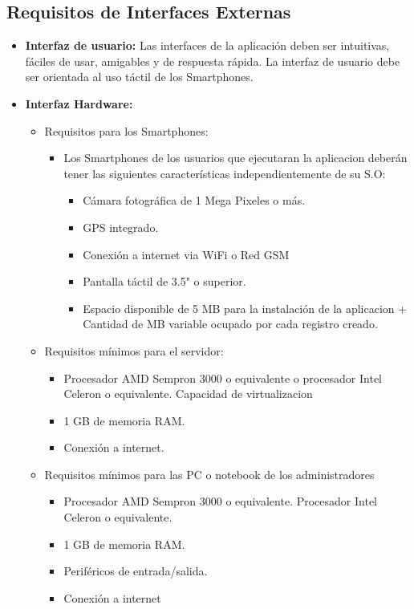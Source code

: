     \subsection{Requisitos de Interfaces Externas}
      \begin{itemize}
        \item \textbf{Interfaz de usuario:} Las interfaces de la aplicación deben ser intuitivas, fáciles de usar, amigables y de respuesta rápida. La interfaz de usuario debe ser orientada al uso táctil de los Smartphones.
        \item \textbf{Interfaz Hardware:} 
          \begin{itemize}
            \item Requisitos para los Smartphones:
              \begin{itemize}
                \item Los Smartphones de los usuarios que ejecutaran la aplicacion deberán tener las siguientes características independientemente de su S.O:
                  \begin{itemize}
                    \item Cámara fotográfica de 1 Mega Pixeles o más.
                    \item GPS integrado.
                    \item Conexión a internet via WiFi o Red GSM
                    \item Pantalla táctil de 3.5" o superior.
                    \item Espacio disponible de 5 MB para la instalación de la aplicacion + Cantidad de MB variable ocupado por cada registro creado. 
                  \end{itemize}
              \end{itemize}
            \item Requisitos mínimos para el servidor:
            \begin{itemize}
              \item Procesador AMD Sempron 3000 o equivalente o procesador Intel Celeron o equivalente. Capacidad de virtualizacion
              \item 1 GB de memoria RAM.
              \item Conexión a internet.
            \end{itemize}
            \item Requisitos mínimos para las PC o notebook de los administradores
            \begin{itemize}
              \item Procesador AMD Sempron 3000 o equivalente. Procesador Intel Celeron o equivalente.
              \item 1 GB de memoria RAM.
              \item Periféricos de entrada/salida.
              \item Conexión a internet
            \end{itemize}
          \end{itemize}
      

\end{itemize}
